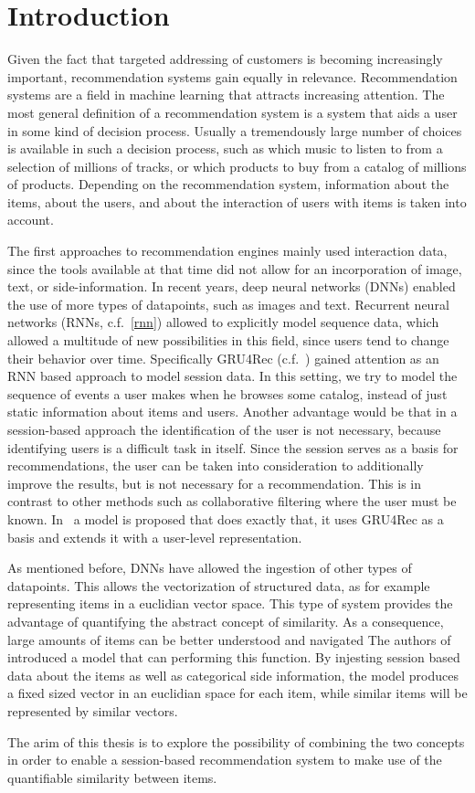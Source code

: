 \chapter{Introduction}
Given the fact that targeted addressing of customers is becoming increasingly important, recommendation systems gain equally in relevance.
Recommendation systems are a field in machine learning that attracts increasing attention.
The most general definition of a recommendation system is a system that aids a user in some kind of decision process.
Usually a tremendously large number of choices is available in such a decision process, such as which music to listen to from a selection of millions of tracks, or which products to buy from a catalog of millions of products.
Depending on the recommendation system, information about the items, about the users, and about the interaction of users with items is taken into account.
\par
The first approaches to recommendation engines mainly used interaction data, since the tools available at that time did not allow for an incorporation of image, text, or side-information.
In recent years, deep neural networks (DNNs) enabled the use of more types of datapoints, such as images and text.
Recurrent neural networks (RNNs, c.f.~\ref{rnn}) allowed to explicitly model sequence data, which allowed a multitude of new possibilities in this field, since users tend to change their behavior over time.
Specifically GRU4Rec (c.f.~\cite{gru4rec}) gained attention as an RNN based approach to model session data.
In this setting, we try to model the sequence of events a user makes when he browses some catalog, instead of just static information about items and users.
Another advantage would be that in a session-based approach the identification of the user is not necessary, because identifying users is a difficult task in itself.
Since the session serves as a basis for recommendations, the user can be taken into consideration to additionally improve the results, but is not necessary for a recommendation.
This is in contrast to other methods such as collaborative filtering where the user must be known.
In~\cite{hierarchical} a model is proposed that does exactly that, it uses GRU4Rec as a basis and extends it with a user-level representation.
\par
As mentioned before, DNNs have allowed the ingestion of other types of datapoints.
This allows the vectorization of structured data, as for example representing items in a euclidian vector space.
This type of system provides the advantage of quantifying the abstract concept of similarity.
As a consequence, large amounts of items can be better understood and navigated
The authors of~\cite{meta_prod2vec} introduced a model that can performing this function.
By injesting session based data about the items as well as categorical side information, the model produces a fixed sized vector in an euclidian space for each item, while similar items will be represented by similar vectors.
\par
The arim of this thesis is to explore the possibility of combining the two concepts in order to enable a session-based recommendation system to make use of the quantifiable similarity between items.